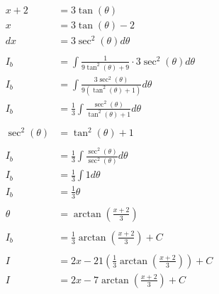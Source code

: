 \documentclass[12pt]{article}
\begin{document}
\begin{align}
    \nonumber                                                                               \\
    x+2            & = 3\tan(\theta)                                                        \\
    x              & = 3\tan(\theta) - 2                                                    \\
    dx             & = 3\sec^2(\theta) d\theta                                              \\
    \nonumber                                                                               \\
    I_b            & = \int \frac{1}{9\tan^2(\theta) + 9} \cdot 3\sec^2(\theta) d\theta     \\
    I_b            & = \int \frac{3\sec^2(\theta)}{9(\tan^2(\theta) + 1)} d\theta           \\
    I_b            & = \frac{1}{3}\int \frac{\sec^2(\theta)}{\tan^2(\theta) + 1} d\theta    \\
    \nonumber                                                                               \\
    \sec^2(\theta) & = \tan^2(\theta) + 1                                                   \\
    \nonumber                                                                               \\
    I_b            & = \frac{1}{3}\int \frac{\sec^2(\theta)}{\sec^2(\theta)} d\theta        \\
    I_b            & = \frac{1}{3}\int 1 d\theta                                            \\
    I_b            & = \frac{1}{3} \theta                                                   \\
    \nonumber                                                                               \\
    \theta         & = \arctan\left(\frac{x+2}{3}\right)                                    \\
    \nonumber                                                                               \\
    I_b            & = \frac{1}{3} \arctan\left(\frac{x+2}{3}\right) + C                    \\
    \nonumber                                                                               \\
    I              & = 2x - 21\left(\frac{1}{3}\arctan\left(\frac{x+2}{3}\right)\right) + C \\
    I              & = 2x - 7\arctan\left(\frac{x+2}{3}\right) + C
\end{align}
\end{document}
